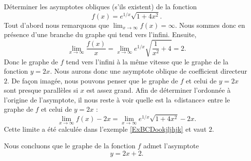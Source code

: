 \begin{example}
    Déterminer les asymptotes obliques (s'ils existent) de la fonction
    \begin{equation}
        f(x)= e^{1/x}\sqrt{1+4x^2}.
    \end{equation}
    Tout d'abord nous remarquons que \( \lim_{x\to \infty} f(x)=\infty\). Nous sommes donc en présence d'une branche du graphe qui tend vers l'infini. Ensuite,
    \begin{equation}
        \lim_{x\to \infty} \frac{ f(x) }{ x }=\lim_{x\to \infty}  e^{1/x}\sqrt{\frac{1}{ x^2 }+4}=2.
    \end{equation}
    Donc le graphe de \( f\) tend vers l'infini à la même vitesse que le graphe de la fonction \( y=2x\). Nous aurons donc une asymptote oblique de coefficient directeur \( 2\). De façon imagée, nous pouvons penser que le graphe de \( f\) et celui de \( y=2x\) sont presque parallèles si \( x\) est assez grand. Afin de déterminer l'ordonnée à l'origine de l'asymptote, il nous reste à voir quelle est la «distance» entre le graphe de \( f\) et celui de \( y=2x\) :
    \begin{equation}
        \lim_{x\to \infty} f(x)-2x=\lim_{x\to \infty}  e^{1/x}\sqrt{1+4x^2}-2x.
    \end{equation}
    Cette limite a été calculée dans l'exemple \ref{ExBCDookjljhjk} et vaut $2$.

	Nous concluons que le graphe de la fonction $f$ admet l'asymptote
    \begin{equation}
	y=2x+2.
    \end{equation}
\end{example}
